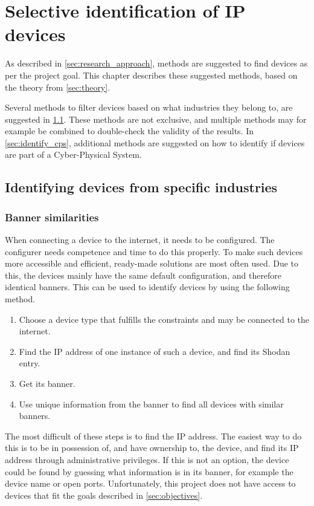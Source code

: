 \section{Selective identification of IP devices} \label{sec:method}
As described in \cref{sec:research_approach}, methods are suggested to find devices as per the project goal. 
This chapter describes these suggested methods, based on the theory from \cref{sec:theory}.

Several methods to filter devices based on what industries they belong to, are suggested in \cref{sec:identify_industry}. These methods are not exclusive, and multiple methods may for example be combined to double-check the validity of the results. In \cref{sec:identify_cps}, additional methods are suggested on how to identify if devices are part of a Cyber-Physical System.

\subsection{Identifying devices from specific industries} \label{sec:identify_industry}
\subsubsection{Banner similarities} \label{sec:banner_method}
When connecting a device to the internet, it needs to be configured. The configurer needs competence and time to do this properly. To make such devices more accessible and efficient, ready-made solutions are most often used. Due to this, the devices mainly have the same default configuration, and therefore identical banners. This can be used to identify devices by using the following method.
\begin{enumerate}
    \item Choose a device type that fulfills the constraints and may be connected to the internet.
    \item Find the IP address of one instance of such a device, and find its Shodan entry.
    \item Get its banner.
    \item Use unique information from the banner to find all devices with similar banners.
\end{enumerate}
The most difficult of these steps is to find the IP address. The easiest way to do this is to be in possession of, and have ownership to, the device, and find its IP address through administrative privileges. 
If this is not an option, the device could be found by guessing what information is in its banner, for example the device name or open ports.
Unfortunately, this project does not have access to devices that fit the goals described in \cref{sec:objectives}.

